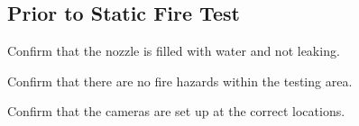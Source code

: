\setcounter{checklistnum}{0}
\newpage

\subsection{Prior to Static Fire Test}
\begin{checklist}
	\item Confirm that the nozzle is filled with water and not leaking.
	\item Confirm that there are no fire hazards within the testing area.
	\item Confirm that the cameras are set up at the correct locations. 
\end{checklist}
\setcounter{checklistnum}{0}

